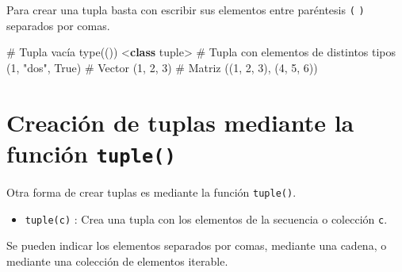 \documentclass[
  spanish,
  a4paper,
]{scrreport}
\newenvironment{Shaded}{\begin{snugshade}}{\end{snugshade}}
\newcommand{\BuiltInTok}[1]{\textcolor[rgb]{0.00,0.23,0.31}{#1}}
\newcommand{\CommentTok}[1]{\textcolor[rgb]{0.37,0.37,0.37}{#1}}
\newcommand{\DecValTok}[1]{\textcolor[rgb]{0.68,0.00,0.00}{#1}}
\newcommand{\KeywordTok}[1]{\textcolor[rgb]{0.00,0.23,0.31}{\textbf{#1}}}
\newcommand{\NormalTok}[1]{\textcolor[rgb]{0.00,0.23,0.31}{#1}}
\newcommand{\OperatorTok}[1]{\textcolor[rgb]{0.37,0.37,0.37}{#1}}
\newcommand{\StringTok}[1]{\textcolor[rgb]{0.13,0.47,0.30}{#1}}
\newcommand{\VariableTok}[1]{\textcolor[rgb]{0.07,0.07,0.07}{#1}}
\providecommand{\tightlist}{%
  \setlength{\itemsep}{0pt}\setlength{\parskip}{0pt}}
\begin{document}
Para crear una tupla basta con escribir sus elementos entre paréntesis
\texttt{(} \texttt{)} separados por comas.

\begin{Shaded}
\begin{Highlighting}[]
\CommentTok{\# Tupla vacía}
\BuiltInTok{type}\NormalTok{(())}
\OperatorTok{\textless{}}\KeywordTok{class} \StringTok{\textquotesingle{}tuple\textquotesingle{}}\OperatorTok{\textgreater{}}
\CommentTok{\# Tupla con elementos de distintos tipos}
\NormalTok{(}\DecValTok{1}\NormalTok{, }\StringTok{"dos"}\NormalTok{, }\VariableTok{True}\NormalTok{)}
\CommentTok{\# Vector}
\NormalTok{(}\DecValTok{1}\NormalTok{, }\DecValTok{2}\NormalTok{, }\DecValTok{3}\NormalTok{)}
\CommentTok{\# Matriz}
\NormalTok{((}\DecValTok{1}\NormalTok{, }\DecValTok{2}\NormalTok{, }\DecValTok{3}\NormalTok{), (}\DecValTok{4}\NormalTok{, }\DecValTok{5}\NormalTok{, }\DecValTok{6}\NormalTok{))}
\end{Highlighting}
\end{Shaded}

\section{\texorpdfstring{Creación de tuplas mediante la función
\texttt{tuple()}}{Creación de tuplas mediante la función tuple()}}\label{creaciuxf3n-de-tuplas-mediante-la-funciuxf3n-tuple}

Otra forma de crear tuplas es mediante la función \texttt{tuple()}.

\begin{itemize}
\tightlist
\item
  \texttt{tuple(c)} : Crea una tupla con los elementos de la secuencia o
  colección \texttt{c}.
\end{itemize}

Se pueden indicar los elementos separados por comas, mediante una
cadena, o mediante una colección de elementos iterable.
\end{document}
